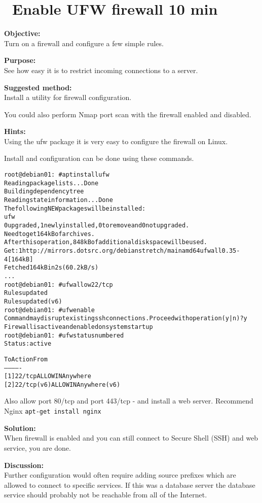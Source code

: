 \documentclass[a4paper,11pt,notitlepage]{report}
\begin{document}
\chapter{\faInfoCircle\ Enable UFW firewall 10 min}
\label{ex:debian-firewall}

{\bf Objective:}\\
Turn on a firewall and configure a few simple rules.

{\bf Purpose:}\\
See how easy it is to restrict incoming connections to a server.


{\bf Suggested method:}\\
Install a utility for firewall configuration.

You could also perform Nmap port scan with the firewall enabled and disabled.

{\bf Hints:}\\
Using the ufw package it is very easy to configure the firewall on Linux.

Install and configuration can be done using these commands.
\begin{alltt}
root@debian01:~# apt install ufw
Reading package lists... Done
Building dependency tree
Reading state information... Done
The following NEW packages will be installed:
  ufw
0 upgraded, 1 newly installed, 0 to remove and 0 not upgraded.
Need to get 164 kB of archives.
After this operation, 848 kB of additional disk space will be used.
Get:1 http://mirrors.dotsrc.org/debian stretch/main amd64 ufw all 0.35-4 [164 kB]
Fetched 164 kB in 2s (60.2 kB/s)
...
root@debian01:~# ufw allow 22/tcp
Rules updated
Rules updated (v6)
root@debian01:~# ufw enable
Command may disrupt existing ssh connections. Proceed with operation (y|n)? y
Firewall is active and enabled on system startup
root@debian01:~# ufw status numbered
Status: active

     To                         Action      From
     --                         ------      ----
[ 1] 22/tcp                     ALLOW IN    Anywhere
[ 2] 22/tcp (v6)                ALLOW IN    Anywhere (v6)
\end{alltt}

Also allow port 80/tcp and port 443/tcp - and install a web server. Recommend Nginx \verb+apt-get install nginx+

{\bf Solution:}\\
When firewall is enabled and you can still connect to Secure Shell (SSH) and web service, you are done.

{\bf Discussion:}\\
Further configuration would often require adding source prefixes which are allowed to connect to specific services. If this was a database server the database service should probably not be reachable from all of the Internet.
\end{document}
